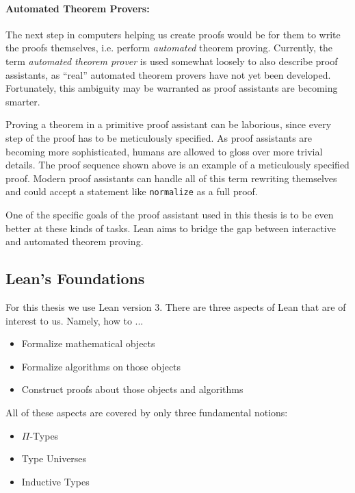 \paragraph{Automated Theorem Provers:}

The next step in computers helping us create proofs would be for them to write the proofs themselves, i.e. perform \emph{automated} theorem proving.
Currently, the term \emph{automated theorem prover} is used somewhat loosely to also describe proof assistants, as ``real'' automated theorem provers have not yet been developed.
Fortunately, this ambiguity may be warranted as proof assistants are becoming smarter.

Proving a theorem in a primitive proof assistant can be laborious, since every step of the proof has to be meticulously specified. 
As proof assistants are becoming more sophisticated, humans are allowed to gloss over more trivial details.
The proof sequence shown above is an example of a meticulously specified proof. 
Modern proof assistants can handle all of this term rewriting themselves and could accept a statement like \lstinline{normalize} as a full proof.

One of the specific goals of the proof assistant used in this thesis is to be even better at these kinds of tasks.
Lean aims to bridge the gap between interactive and automated theorem proving.

\break 

\subsection{Lean's Foundations} 

For this thesis we use Lean version 3.
There are three aspects of Lean that are of interest to us. Namely, how to ...

\begin{itemize}
    \item Formalize mathematical objects
    \item Formalize algorithms on those objects
    \item Construct proofs about those objects and algorithms
\end{itemize}

\noindent All of these aspects are covered by only three fundamental notions:

\begin{itemize}
  \item $\Pi$-Types
  \item Type Universes
  \item Inductive Types
\end{itemize}

